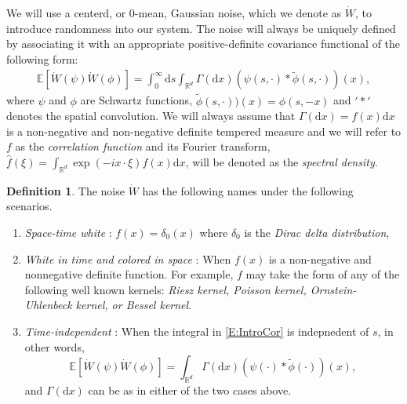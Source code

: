 \documentclass[12pt]{report}
\theoremstyle{plain}
\theoremstyle{definition}
\newtheorem{definition}[theorem]{Definition}
\numberwithin{equation}{section}
\newcommand{\R}{\mathbb{R}}
\newcommand{\E}{\mathbb{E}}
\newcommand{\ud}{\ensuremath{ \mathrm{d} }}
\begin{document}
We will use a centerd, or $0$-mean, Gaussian noise, which we denote as $\dot{W}$, to introduce randomness into our system. The noise will always be uniquely defined by associating it with an appropriate positive-definite covariance functional of the following form:
	\begin{align} \label{E:IntroCor}
	\E \left[ \dot{W}\left(\psi\right)\dot{W}\left(\phi\right) \right]
	= \int_0^\infty \ud s \int_{\R^d} \Gamma(\ud x)(\psi(s,\cdot)*\widetilde{\phi}(s,\cdot))(x), 
	\end{align}
where $\psi$ and $\phi$ are Schwartz functions, $\widetilde{\phi}(s,\cdot))(x) = \phi(s,-x)$ and $'*'$ denotes the spatial convolution. We will always assume that $\Gamma(\ud x) = f(x) \ud x$ is a non-negative and non-negative definite tempered measure and we will refer to $f$ as the {\em correlation function} and its Fourier transform, $\widehat{f}(\xi) = \int_{\R^d} \exp(-i x \cdot \xi) f(x) \ud x$, will be denoted as the {\em spectral density}. 
	\begin{definition}
		The noise $\dot{W}$ has the following names under the following scenarios.
		\begin{enumerate}
			\item {\em Space-time white} : $f(x) = \delta_0(x)$ where $\delta_0$ is the {\em Dirac delta distribution},
			\item {\em White in time and colored in space} : When $f(x)$ is a non-negative and nonnegative definite function. For example, $f$ may take the form of any of the following well known kernels: {\em Riesz kernel, Poisson kernel, Ornstein-Uhlenbeck kernel, or Bessel kernel}.
			\item {\em Time-independent} : When the integral in \eqref{E:IntroCor} is indepnedent of $s$, in other words, 
				\[
						\E \left[ \dot{W}\left(\psi\right)\dot{W}\left(\phi\right) \right]
					= \int_{\R^d} \Gamma(\ud x)(\psi(\cdot)*\widetilde{\phi}(\cdot))(x),
				\]
			and $\Gamma(\ud x)$ can be as in either of the two cases above. 
		\end{enumerate}
	\end{definition}
\end{document}
